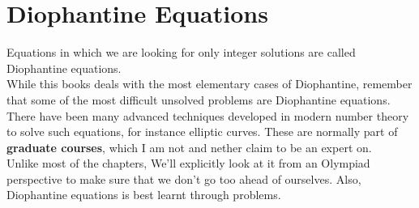 \chapter{Diophantine Equations}
Equations in which we are looking for only integer solutions are called Diophantine equations.\\
While this books deals with the most elementary cases of Diophantine, remember that some of the most difficult unsolved problems are Diophantine equations. There have been many advanced techniques developed in modern number theory to solve such equations, for instance elliptic curves. These are normally part of \textbf{graduate courses}, which I am not and nether claim to be an expert on.\\
Unlike most of the chapters, We'll explicitly look at it from an Olympiad perspective to make sure that we don't go too ahead of ourselves. Also, Diophantine equations is best learnt through problems.\\
